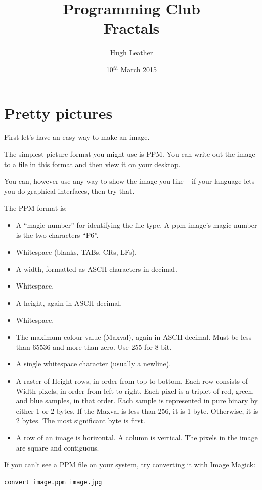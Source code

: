 \documentclass{article}
\title{
    \textbf{Programming Club}\\
    Fractals
}
\author{Hugh Leather}
\date{10$^{th}$ March 2015}
\begin{document}
    \maketitle
    
    \section{Pretty pictures}
        First let's have an easy way to make an image.  

        The simplest picture format you might use is PPM.  You can write out the image to a file in this format and then view it on your 
        desktop.
        
        You can, however use any way to show the image you like -- if your language lets you do graphical interfaces, then try that.
        
        The PPM format is:
        \begin{itemize}
            \item A ``magic number'' for identifying the file type. A ppm image's magic number is the two characters ``P6''.
            \item Whitespace (blanks, TABs, CRs, LFs).
            \item A width, formatted as ASCII characters in decimal.
            \item Whitespace.
            \item A height, again in ASCII decimal.
            \item Whitespace.
            \item The maximum colour value (Maxval), again in ASCII decimal. Must be less than 65536 and more than zero. Use 255 for 8 bit.
            \item A single whitespace character (usually a newline).
            \item A raster of Height rows, in order from top to bottom. Each row consists of Width pixels, in order from left to right.
            Each pixel is a triplet of red, green, and blue samples, in that order. Each sample is represented in pure binary by either 1
            or 2 bytes. If the Maxval is less than 256, it is 1 byte. Otherwise, it is 2 bytes. The most significant byte is first.
            \item A row of an image is horizontal. A column is vertical. The pixels in the image are square and contiguous.
        \end{itemize}

        If you can't see a PPM file on your system, try converting it with Image Magick:
        \begin{centering}
            \texttt{convert image.ppm image.jpg}
        \end{centering}
        
\end{document}
